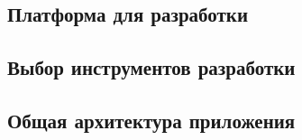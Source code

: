 
\subsection{Платформа для разработки}

\subsection{Выбор инструментов разработки}

\subsection{Общая архитектура приложения}

\newpage